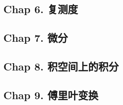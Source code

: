 \subsection{Chap 6. 复测度}

\subsection{Chap 7. 微分}

\subsection{Chap 8. 积空间上的积分}

\subsection{Chap 9. 傅里叶变换}

